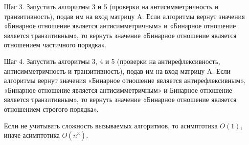 \documentclass[spec, och, labwork]{shiza}
\begin{document}
\begin{enumerate}
                Шаг 3. Запустить алгоритмы 3 и 5 (проверки на антисимметричность и транзитивность), подав им на вход матрицу A. Если алгоритмы вернут значения «Бинарное отношение является антисимметричным» и «Бинарное отношение является транзитивным», то вернуть значение «Бинарное отношение является отношением частичного порядка».

                Шаг 4. Запустить алгоритмы 3, 4 и 5 (проверки на антирефлексивность, антисимметричность и транзитивность), подав им на вход матрицу A. Если алгоритмы вернут значения «Бинарное отношение является антирефлексивным», «Бинарное отношение является антисимметричным» и Бинарное отношение является транзитивным», то вернуть значение «Бинарное отношение является отношением строгого порядка».

                Если не учитывать сложность вызываемых алгоритмов, то асимптотика $O(1)$, иначе асимптотика $O(n^3)$.

            \end{enumerate}
        
\end{document}
